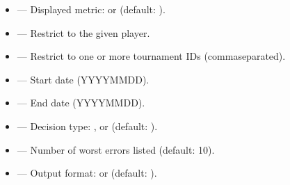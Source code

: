 \documentclass[letterpaper,10pt,english]{sphinxmanual}
\begin{document}
\sphinxAtStartPar
{}
\begin{itemize}
\item {} 
\sphinxAtStartPar
{} — Displayed metric:  or  (default: ).

\item {} 
\sphinxAtStartPar
{} — Restrict to the given player.

\item {} 
\sphinxAtStartPar
{} — Restrict to one or more tournament IDs (comma\sphinxhyphen{}separated).

\item {} 
\sphinxAtStartPar
{} — Start date (YYYY\sphinxhyphen{}MM\sphinxhyphen{}DD).

\item {} 
\sphinxAtStartPar
{} — End date (YYYY\sphinxhyphen{}MM\sphinxhyphen{}DD).

\item {} 
\sphinxAtStartPar
{} — Decision type: ,  or  (default: ).

\item {} 
\sphinxAtStartPar
{} — Number of worst errors listed (default: 10).

\item {} 
\sphinxAtStartPar
{} — Output format:  or  (default: ).

\end{itemize}

\sphinxAtStartPar
{}
\end{document}
